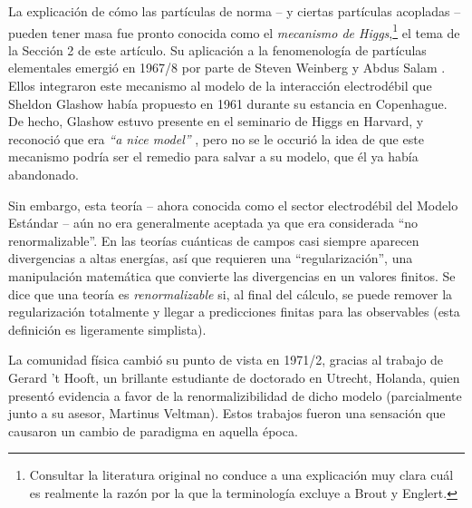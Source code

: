 La explicaci\'on de c\'omo  las part\'iculas de norma -- y ciertas part\'iculas
acopladas -- pueden tener masa fue pronto conocida como el {\em mecanismo
de Higgs},\footnote{Consultar la literatura original no conduce a
  una explicaci\'on muy clara cu\'al es realmente la raz\'on por la que la
  terminolog\'ia excluye a Brout y Englert.}
  el tema de la Secci\'on 2 de este art\'iculo.
Su aplicaci\'on a la fenomenolog\'ia de part\'iculas elementales 
emergi\'o en 1967/8 por parte de Steven Weinberg \cite{Weinberg} y
Abdus Salam \cite{Salam}.
Ellos integraron este mecanismo al modelo de la interacci\'on
electrod\'ebil que Sheldon Glashow hab\'ia propuesto en 1961
\cite{Glashow} durante su estancia en Copenhague.
De hecho, Glashow estuvo presente en el seminario de Higgs en Harvard,
y reconoci\'o que era {\it ``a nice model''} \cite{boson}, pero no se le
occuri\'o la idea de que este mecanismo podr\'ia ser el remedio
para salvar a su modelo, que \'el ya hab\'ia abandonado.

Sin embargo, esta teor\'ia -- ahora conocida como el sector
electrod\'ebil del Modelo Est\'andar -- a\'un no era generalmente
aceptada ya que era considerada ``no renormalizable''.
En las teor\'ias cu\'anticas de campos casi siempre aparecen divergencias
a altas energ\'ias, as\'i que requieren una ``regularizaci\'on'',
una manipulaci\'on matem\'atica que convierte las divergencias
en un valores finitos. Se dice que una teor\'ia es {\em renormalizable}
si, al final del c\'alculo, se puede remover la regularizaci\'on
totalmente y llegar a predicciones finitas para las observables
(esta definici\'on es ligeramente simplista).

La comunidad f\'isica cambi\'o su punto de vista en 1971/2, gracias
al trabajo de Gerard 't Hooft, un brillante estudiante de doctorado
en Utrecht, Holanda, quien present\'o evidencia a favor de la
renormalizibilidad de dicho modelo (parcialmente junto a
su asesor, Martinus Veltman). Estos trabajos \cite{tHooft} fueron
una sensaci\'on que causaron un cambio de paradigma en aquella \'epoca.

